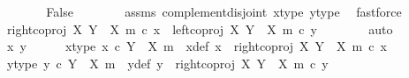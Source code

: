 \begin{isabellebody}
\ \ \ \ \isamarkupfalse%
\ \isamarkupfalse%
\ False\isanewline
\ \ \ \ \ \ \isamarkupfalse%
\ assms\ complement{\isacharunderscore}{\kern0pt}disjoint\ x{\isacharprime}{\kern0pt}{\isacharunderscore}{\kern0pt}type\ y{\isacharprime}{\kern0pt}{\isacharunderscore}{\kern0pt}type\ \isamarkupfalse%
\ fastforce\isanewline
\ \ \ \ \isamarkupfalse%
\ \isamarkupfalse%
\ {\isachardoublequoteopen}right{\isacharunderscore}{\kern0pt}coproj\ X\ {\isacharparenleft}{\kern0pt}Y\ {\isasymsetminus}\ {\isacharparenleft}{\kern0pt}X{\isacharcomma}{\kern0pt}\ m{\isacharparenright}{\kern0pt}{\isacharparenright}{\kern0pt}\ {\isasymcirc}\isactrlsub c\ x{\isacharprime}{\kern0pt}\ {\isacharequal}{\kern0pt}\ left{\isacharunderscore}{\kern0pt}coproj\ X\ {\isacharparenleft}{\kern0pt}Y\ {\isasymsetminus}\ {\isacharparenleft}{\kern0pt}X{\isacharcomma}{\kern0pt}\ m{\isacharparenright}{\kern0pt}{\isacharparenright}{\kern0pt}\ {\isasymcirc}\isactrlsub c\ y{\isacharprime}{\kern0pt}{\isachardoublequoteclose}\isanewline
\ \ \ \ \ \ \isamarkupfalse%
\ auto\isanewline
\ \ \isamarkupfalse%
\isanewline
\ \ \ \ \isamarkupfalse%
\ x{\isacharprime}{\kern0pt}\ y{\isacharprime}{\kern0pt}\isanewline
\ \ \ \ \isamarkupfalse%
\ x{\isacharprime}{\kern0pt}{\isacharunderscore}{\kern0pt}type{\isacharcolon}{\kern0pt}\ {\isachardoublequoteopen}x{\isacharprime}{\kern0pt}\ {\isasymin}\isactrlsub c\ Y\ {\isasymsetminus}\ {\isacharparenleft}{\kern0pt}X{\isacharcomma}{\kern0pt}\ m{\isacharparenright}{\kern0pt}{\isachardoublequoteclose}\ \ x{\isacharunderscore}{\kern0pt}def{\isacharcolon}{\kern0pt}\ {\isachardoublequoteopen}x\ {\isacharequal}{\kern0pt}\ right{\isacharunderscore}{\kern0pt}coproj\ X\ {\isacharparenleft}{\kern0pt}Y\ {\isasymsetminus}\ {\isacharparenleft}{\kern0pt}X{\isacharcomma}{\kern0pt}\ m{\isacharparenright}{\kern0pt}{\isacharparenright}{\kern0pt}\ {\isasymcirc}\isactrlsub c\ x{\isacharprime}{\kern0pt}{\isachardoublequoteclose}\isanewline
\ \ \ \ \isamarkupfalse%
\ y{\isacharprime}{\kern0pt}{\isacharunderscore}{\kern0pt}type{\isacharcolon}{\kern0pt}\ {\isachardoublequoteopen}y{\isacharprime}{\kern0pt}\ {\isasymin}\isactrlsub c\ Y\ {\isasymsetminus}\ {\isacharparenleft}{\kern0pt}X{\isacharcomma}{\kern0pt}\ m{\isacharparenright}{\kern0pt}{\isachardoublequoteclose}\ \ y{\isacharunderscore}{\kern0pt}def{\isacharcolon}{\kern0pt}\ {\isachardoublequoteopen}y\ {\isacharequal}{\kern0pt}\ right{\isacharunderscore}{\kern0pt}coproj\ X\ {\isacharparenleft}{\kern0pt}Y\ {\isasymsetminus}\ {\isacharparenleft}{\kern0pt}X{\isacharcomma}{\kern0pt}\ m{\isacharparenright}{\kern0pt}{\isacharparenright}{\kern0pt}\ {\isasymcirc}\isactrlsub c\ y{\isacharprime}{\kern0pt}{\isachardoublequoteclose}\isanewline

\end{isabellebody}
